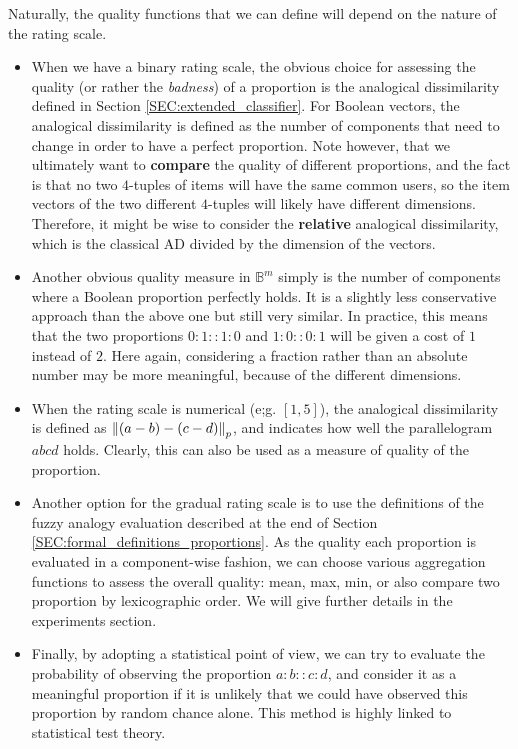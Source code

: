Naturally, the quality functions that we can define will depend on the nature
of the rating scale.

\begin{itemize}
  \item When we have a binary rating scale, the obvious choice for assessing
    the quality (or rather the \textit{badness}) of a proportion is the
    analogical dissimilarity defined in Section \ref{SEC:extended_classifier}. For Boolean
    vectors, the analogical dissimilarity is defined as the number of
    components that need to change in order to have a perfect proportion. Note
    however, that we ultimately want to \textbf{compare} the quality of
    different proportions, and the fact is that no two $4$-tuples of items will
    have the same common users, so the item vectors of the two different
    $4$-tuples will likely have different dimensions. Therefore, it might be
    wise to consider the \textbf{relative} analogical dissimilarity, which is
    the classical AD divided by the dimension of the vectors.
  \item Another obvious quality measure in $\mathbb{B}^m$ simply is the number
    of components where a Boolean proportion perfectly holds. It is a slightly
    less conservative approach than the above one but still very similar. In
    practice, this means that the two proportions $0:1::1:0$ and $1:0::0:1$
    will be given a cost of $1$ instead of $2$. Here again, considering a
    fraction rather than an absolute number may be more meaningful, because
    of the different dimensions.
  \item When the rating scale is numerical (e;g. $[1, 5]$), the analogical dissimilarity is
    defined as $\norm{p}{(a - b) - (c - d)}$, and indicates how well the
    parallelogram $abcd$ holds. Clearly, this can also be used as a measure of
    quality of the proportion.
  \item Another option for the gradual rating scale is to use the definitions
    of the fuzzy analogy evaluation described at the end of Section
    \ref{SEC:formal_definitions_proportions}. As the quality each proportion is
    evaluated in a component-wise fashion, we can choose various aggregation
    functions to assess the overall quality: mean, max, min, or also compare
    two proportion by lexicographic order. We will give further details in the
    experiments section.
  \item Finally, by adopting a statistical point of view, we can try to
    evaluate the probability of observing the proportion $a:b::c:d$, and
    consider it as a meaningful proportion if it is unlikely that we could have
    observed this proportion by random chance alone. This method is highly
    linked to statistical test theory.
\end{itemize}

